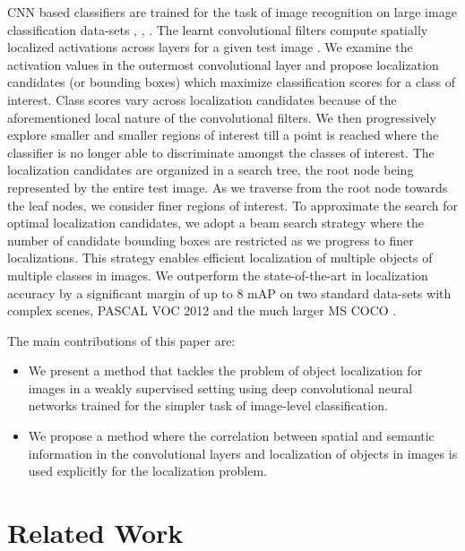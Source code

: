 \documentclass[runningheads]{llncs}
\begin{document}
CNN based classifiers are trained for the task of image recognition on large image classification data-sets \cite{deng2009imagenet}, \cite{pascal-voc-2012}, \cite{pascal-voc-2007}. The learnt convolutional filters compute spatially localized activations across layers for a given test image \cite{mahendran2014understanding}. We examine  the activation values in the outermost convolutional layer and propose localization candidates (or bounding boxes) which maximize classification scores for a class of interest. Class scores vary across localization candidates because of the aforementioned local nature of the convolutional filters. We then progressively explore smaller and smaller regions of interest till a point is reached where the classifier is no longer able to discriminate amongst the classes of interest. The localization candidates are organized in a search tree, the root node being represented by the entire test image. As we traverse from the root node towards the leaf nodes, we consider finer regions of interest. To approximate the search for optimal localization candidates, we adopt a beam search strategy where the number of candidate bounding boxes are restricted as we progress to finer localizations. This strategy enables efficient localization of multiple objects of multiple classes in images. We  outperform the state-of-the-art in localization accuracy by a significant margin of up to 8 mAP on two standard data-sets with complex scenes, PASCAL VOC 2012 \cite{pascal-voc-2012} and the much larger MS COCO \cite{lin2014microsoft}.


The main contributions of this paper are:

\begin{itemize}
    \item{We present a method that tackles the problem of object localization for images in a weakly supervised setting using deep convolutional neural networks trained for the simpler task of image-level classification.}

    \item{We propose a method where the correlation between spatial and semantic information in the convolutional layers and localization of objects in images  is used explicitly for the localization problem.}
\end{itemize}


\section{Related Work}\label{section:relatedWorks}
\end{document}
